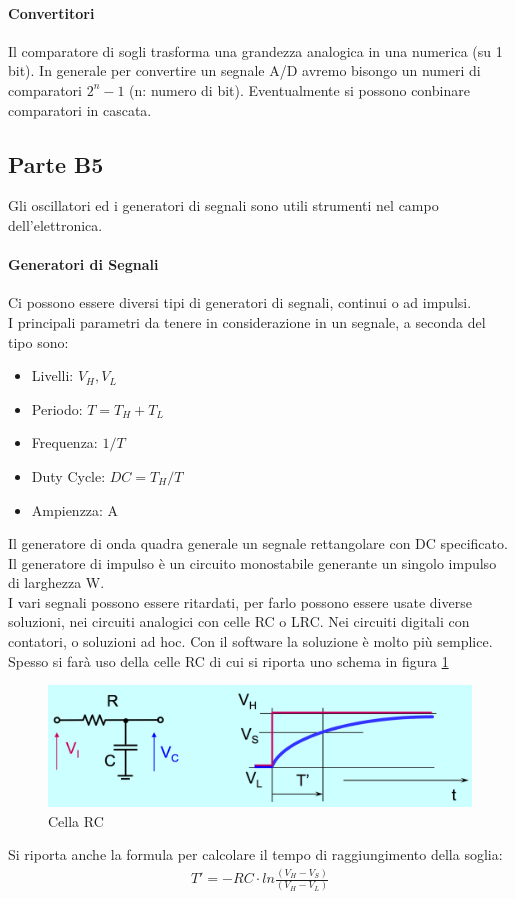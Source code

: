\documentclass[12pt]{article}
\begin{document}
\paragraph{Convertitori} Il comparatore di sogli trasforma una grandezza analogica in una numerica (su 1 bit). In generale per convertire un segnale A/D avremo bisongo un numeri di comparatori $2^n-1$ (n: numero di bit). Eventualmente si possono conbinare comparatori in cascata.

\subsection{Parte B5}\label{b5}
Gli oscillatori ed i generatori di segnali sono utili strumenti nel campo dell'elettronica.

\paragraph{Generatori di Segnali} Ci possono essere diversi tipi di generatori di segnali, continui o ad impulsi.\\
I principali parametri da tenere in considerazione in un segnale, a seconda del tipo sono:
\begin{itemize}
  \item Livelli: $V_{H}, V_{L}$
  \item Periodo: $T = T_{H} + T_{L}$
  \item Frequenza: $1/T$
  \item Duty Cycle: $DC = T_{H}/T$
  \item Ampienzza: A
\end{itemize}
Il generatore di onda quadra generale un segnale rettangolare con DC specificato. Il generatore di impulso è un circuito monostabile generante un singolo impulso di larghezza W.\\
I vari segnali possono essere ritardati, per farlo possono essere usate diverse soluzioni, nei circuiti analogici con celle RC o LRC. Nei circuiti digitali con contatori, o soluzioni ad hoc. Con il software la soluzione è molto più semplice. Spesso si farà uso della celle RC di cui si riporta uno schema in figura \ref{fig:rc}
\begin{figure}[!hp]
  \includegraphics[width=\textwidth]{images/cellRC.png}
  \caption{Cella RC}
  \label{fig:rc}
\end{figure}
Si riporta anche la formula per calcolare il tempo di raggiungimento della soglia:\\
\begin{equation}
  \begin{gathered}
    T' = -RC\cdot ln\frac {(V_{H}-V_{S})} {(V_{H}-V_{L})}
    \label{eq:tsoglie}
  \end{gathered}
\end{equation}
\end{document}
